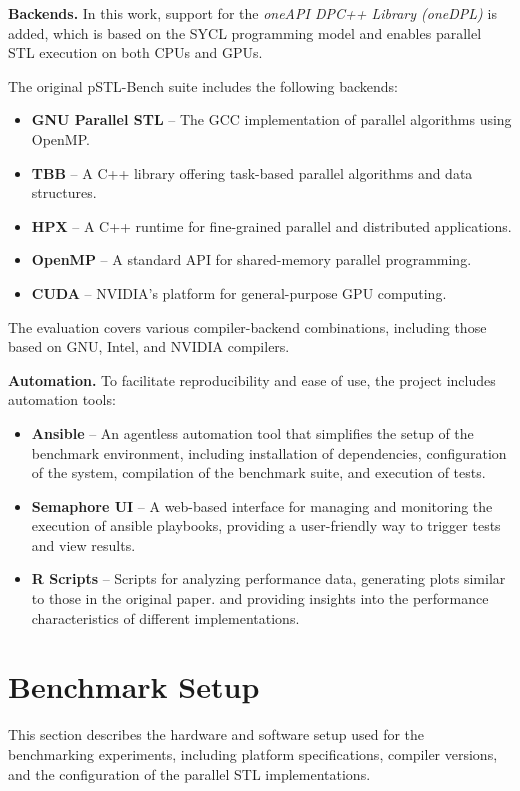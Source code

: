 \documentclass[sigconf]{acmart}
\newcommand{\mypar}[1]{{\bf #1.}}
\begin{document}
\mypar{Backends} In this work, support for the \textit{oneAPI DPC++ Library (oneDPL)} is added, which is based on the SYCL
programming model and enables parallel STL execution on both CPUs and GPUs.

The original pSTL-Bench suite includes the following backends:
\begin{itemize}
      \item \textbf{GNU Parallel STL} – The GCC implementation of parallel algorithms using OpenMP.
      \item \textbf{TBB} – A C++ library offering task-based parallel algorithms and data structures.
      \item \textbf{HPX} – A C++ runtime for fine-grained parallel and distributed applications.
      \item \textbf{OpenMP} – A standard API for shared-memory parallel programming.
      \item \textbf{CUDA} – NVIDIA’s platform for general-purpose GPU computing.
\end{itemize}

The evaluation covers various compiler-backend combinations, including those
based on GNU, Intel, and NVIDIA compilers.

\mypar{Automation} To facilitate reproducibility and ease of use, the project includes automation tools:
\begin{itemize}
      \item \textbf{Ansible} – An agentless automation tool that simplifies the setup of the benchmark environment,
            including installation of dependencies, configuration of the system, compilation of the benchmark suite, and execution of tests.
      \item \textbf{Semaphore UI} – A web-based interface for managing and monitoring the execution of ansible playbooks,
            providing a user-friendly way to trigger tests and view results.
      \item \textbf{R Scripts} – Scripts for analyzing performance data, generating plots similar to those in the original paper.
            and providing insights into the performance characteristics of different implementations.
\end{itemize}

\section{Benchmark Setup}\label{sec:benchmark_setup}

This section describes the hardware and software setup used for the
benchmarking experiments, including platform specifications, compiler versions,
and the configuration of the parallel STL implementations.
\end{document}
